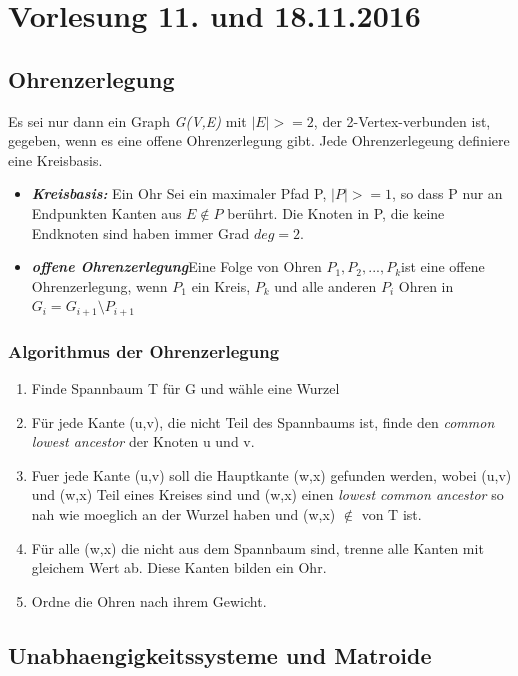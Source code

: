 \section{Vorlesung 11. und 18.11.2016}
\subsection{Ohrenzerlegung}

Es sei nur dann ein Graph \textit{G(V,E)} mit $|E|>=2$, der 2-Vertex-verbunden ist, gegeben, wenn es eine offene Ohrenzerlegung gibt. Jede Ohrenzerlegeung definiere eine Kreisbasis.

\begin{itemize}
	\item \textbf{\textit{Kreisbasis:}} \newline Ein Ohr Sei ein maximaler Pfad P, $|P| >= 1$, so dass P nur an Endpunkten Kanten aus $E\notin P$ berührt. Die Knoten in P, die keine Endknoten sind haben immer Grad $deg = 2$.
	\item \textbf{\textit{offene Ohrenzerlegung}}\newline Eine Folge von Ohren $P_1, P_2, ..., P_k$ist eine offene Ohrenzerlegung, wenn $P_1$ ein Kreis, $P_k$ und alle anderen $P_i$ Ohren in $G_i = G_{i+1} \setminus P_{i+1}$ 
\end{itemize}
\subsubsection{Algorithmus der Ohrenzerlegung}
\begin{enumerate}
	\item Finde Spannbaum T für G und wähle eine Wurzel
	\item Für jede Kante (u,v), die nicht Teil des Spannbaums ist, finde den \textit{common lowest ancestor} der Knoten u und v.
	\item Fuer jede Kante (u,v) soll die Hauptkante (w,x) gefunden werden, wobei (u,v) und (w,x) Teil eines Kreises sind und (w,x) einen \textit{lowest common ancestor} so nah wie moeglich an der Wurzel haben und (w,x) $\notin$ von T ist.
	\item Für alle (w,x) die nicht aus dem Spannbaum sind, trenne alle Kanten mit gleichem Wert ab. Diese Kanten bilden ein Ohr.
	\item Ordne die Ohren nach ihrem Gewicht. 
\end{enumerate}
\subsection{Unabhaengigkeitssysteme und Matroide}

